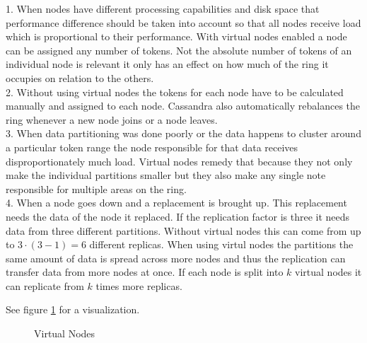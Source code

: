 1. When nodes have different processing capabilities and disk space that performance difference should be taken into account so that all nodes receive load which is proportional to their performance. With virtual nodes enabled a node can be assigned any number of tokens. Not the absolute number of tokens of an individual node is relevant it only has an effect on how much of the ring it occupies on relation to the others.  \\
2. Without using virtual nodes the tokens for each node have to be calculated manually and assigned to each node. Cassandra also automatically rebalances the ring whenever a new node joins or a node leaves. \\
3. When data partitioning was done poorly or the data happens to cluster around a particular token range the node responsible for that data receives disproportionately much load. Virtual nodes remedy that because they not only make the individual partitions smaller but they also make any single note responsible for multiple areas on the ring. \\
4. When a node goes down and a replacement is brought up. This replacement needs the data of the node it replaced. If the replication factor is three it needs data from three different partitions. Without virtual nodes this can come from up to $3\cdot(3-1)=6$ different replicas. When using virtul nodes the partitions the same amount of data is spread across more nodes and thus the replication can transfer data from more nodes at once. If each node is split into $k$ virtual nodes it can replicate from $k$ times more replicas.

See figure \ref{fig:cassandra:vnodes} for a visualization.

\begin{figure}[ht]
  \centering
  \caption{Virtual Nodes}
  \label{fig:cassandra:vnodes}
\end{figure}

